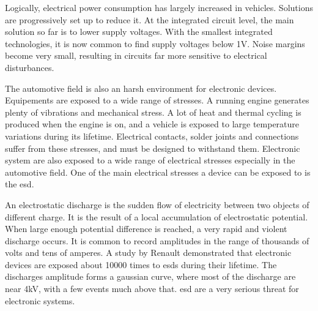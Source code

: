 Logically, electrical power consumption has largely increased in vehicles.
Solutions are progressively set up to reduce it.
At the integrated circuit level, the main solution so far is to lower supply voltages.
With the smallest integrated technologies, it is now common to find supply voltages below 1V.
Noise margins become very small, resulting in circuits far more sensitive to electrical disturbances.

The automotive field is also an harsh environment for electronic devices.
Equipements are exposed to a wide range of stresses.
A running engine generates plenty of vibrations and mechanical stress.
A lot of heat and thermal cycling is produced when the engine is on, and a vehicle is exposed to large temperature variations during its lifetime.
Electrical contacts, solder joints and connections suffer from these stresses, and must be designed to withstand them.
Electronic system are also exposed to a wide range of electrical stresses especially in the automotive field.
One of the main electrical stresses a device can be exposed to is the \gls{esd}.

An electrostatic discharge is the sudden flow of electricity between two objects of different charge.
It is the result of a local accumulation of electrostatic potential.
When large enough potential difference is reached, a very rapid and violent discharge occurs.
It is common to record amplitudes in the range of thousands of volts and tens of amperes.
A study by Renault \cite{Renault-esd} demonstrated that electronic devices are exposed about 10000 times to \gls{esd}s during their lifetime.
The discharges amplitude forms a gaussian curve, where most of the discharge are near 4kV, with a few events much above that.
\gls{esd} are a very serious threat for electronic systems.

